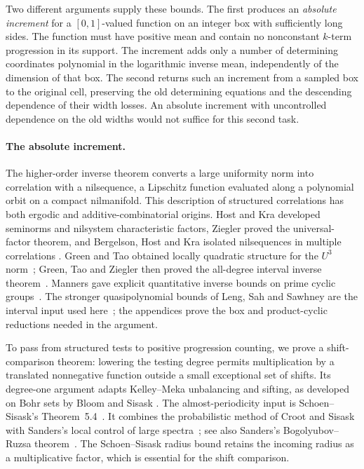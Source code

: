 Two different arguments supply these bounds. The first produces
an \emph{absolute increment} for a $[0,1]$-valued function on an
integer box with sufficiently long sides. The function must have
positive mean and contain no
nonconstant $k$-term progression in its support. The increment
adds only a number of
determining coordinates polynomial in the logarithmic inverse
mean, independently of the dimension of that box. The second
returns such an increment from a sampled box to the original
cell, preserving the old determining equations and the
descending dependence of their width losses. An absolute
increment with uncontrolled dependence on the old widths would
not suffice for this second task.

\paragraph{The absolute increment.}
The higher-order inverse theorem converts a large uniformity
norm into correlation with a nilsequence, a Lipschitz function
evaluated along a polynomial orbit on a compact nilmanifold.
This description of structured correlations has both ergodic
and additive-combinatorial origins. Host and Kra developed
seminorms and nilsystem characteristic factors, Ziegler proved
the universal-factor theorem, and Bergelson, Host and Kra
isolated nilsequences in multiple correlations
\cite{HostKra2005,Ziegler2007,BergelsonHostKra2005}.
Green and Tao obtained locally quadratic structure for the
$U^3$ norm~\cite{GreenTaoU32008}; Green, Tao and Ziegler then
proved the all-degree interval inverse
theorem~\cite{GreenTaoZiegler2012}.
Manners gave explicit quantitative inverse bounds on prime
cyclic groups~\cite{Manners2018}. The stronger quasipolynomial
bounds of Leng, Sah and Sawhney are the interval input used
here~\cite[Theorem~1.2]{LSSInverse2024}; the appendices prove
the box and product-cyclic reductions needed in the argument.

To pass from structured tests to positive progression counting,
we prove a shift-comparison theorem: lowering the testing degree
permits multiplication by a translated nonnegative function
outside a small exceptional set of shifts. Its degree-one
argument adapts Kelley--Meka unbalancing and sifting, as
developed on Bohr sets by Bloom and Sisask
\cite{KelleyMeka2023,BloomSisaskKelleyMeka}.
The almost-periodicity input is Schoen--Sisask's
Theorem~5.4~\cite{SchoenSisask2016}. It combines the probabilistic
method of Croot and Sisask with Sanders's local control of large
spectra~\cite{CrootSisask2010,SandersSumsets2008}; see also
Sanders's Bogolyubov--Ruzsa theorem~\cite{SandersBogolyubov2012}.
The Schoen--Sisask radius bound retains the incoming radius as a multiplicative
factor, which is essential for the shift comparison.

